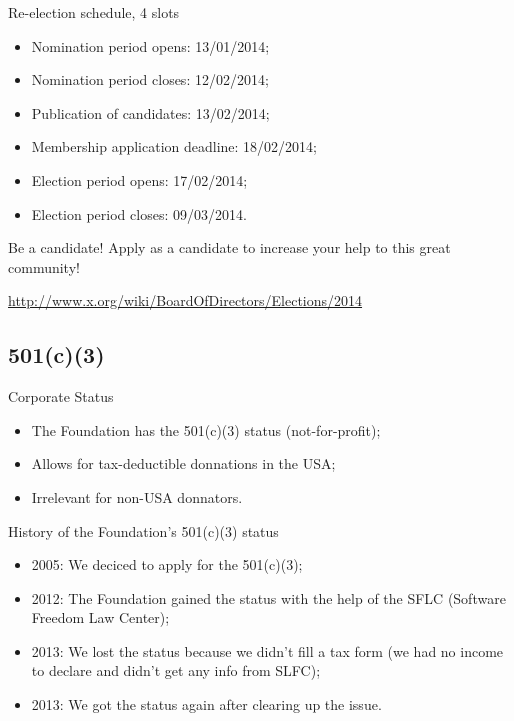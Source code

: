 \documentclass{beamer}
\begin{document}
		\begin{frame}
			\begin{block}{Re-election schedule, 4 slots}
				\begin{itemize}
					\item Nomination period opens: 13/01/2014;
					\item Nomination period closes: 12/02/2014;
					\item Publication of candidates: 13/02/2014;
					\item Membership application deadline: 18/02/2014;
					\item Election period opens: 17/02/2014;
					\item Election period closes: 09/03/2014.
				\end{itemize}
			\end{block}

			\begin{block}{Be a candidate!}
				Apply as a candidate to increase your help to this great community!
			\end{block}

			\begin{block}{}
				\url{http://www.x.org/wiki/BoardOfDirectors/Elections/2014}
			\end{block}
		\end{frame}

		\subsection{501(c)(3)}
		\begin{frame}
			\begin{block}{Corporate Status}
				\begin{itemize}
					\item The Foundation has the 501(c)(3) status (not-for-profit);
					\item Allows for tax-deductible donnations in the USA;
					\item Irrelevant for non-USA donnators.
				\end{itemize}
			\end{block}

			\begin{block}{History of the Foundation's 501(c)(3) status}
				\begin{itemize}
					\item 2005: We deciced to apply for the 501(c)(3);
					\item 2012: The Foundation gained the status with the help
of the SFLC (Software Freedom Law Center);
					\item 2013: We lost the status because we didn't
fill a tax form (we had no income to declare and didn't get any info from SLFC);
					\item 2013: We got the status again after clearing up the issue.
				\end{itemize}
			\end{block}
		\end{frame}
\end{document}
